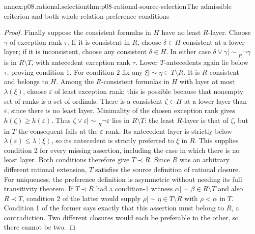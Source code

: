 \begin{annexitem}{annex:p08.rational.selection}{thm:p08-rational-source-selection}{The admissible criterion and both whole-relation preference conditions}
\begin{proof}
Finally suppose the consistent formulas in \(H\) have no least
\(R\)-layer. Choose \(\gamma\) of exception rank \(\tau\).
If it is consistent in \(R\), choose \(\delta\in H\) consistent
at a lower layer; if it is inconsistent, choose any consistent
\(\delta\in H\). In either case
\(\delta\vee\gamma\mathrel{|\!\sim}_R\neg\gamma\)
is in \(R\setminus T\), with antecedent exception rank \(\tau\).
Lower \(T\)-antecedents again lie below \(\tau\), proving
condition 1. For condition 2 fix any
\(\xi\mathrel{|\!\sim}\eta\in T\setminus R\).
It is \(R\)-consistent and belongs to \(H\). Among the
\(R\)-consistent formulas in \(H\) with layer at most
\(\lambda(\xi)\), choose \(\varepsilon\) of least exception
rank; this is possible because that nonempty set of ranks is a set
of ordinals. There is a consistent \(\zeta\in H\) at a lower
layer than \(\varepsilon\), since there is no least layer.
Minimality of the chosen exception rank gives
\(h(\zeta)\geq h(\varepsilon)\).
Thus \(\zeta\vee\varepsilon\mathrel{|\!\sim}_R\neg\varepsilon\)
lies in \(R\setminus T\): the least \(R\)-layer is that of
\(\zeta\), but in \(T\) the consequent fails at the
\(\varepsilon\) rank. Its antecedent layer is strictly below
\(\lambda(\varepsilon)\leq\lambda(\xi)\), so its antecedent
is strictly preferred to \(\xi\) in \(R\). This supplies
condition 2 for every missing assertion, including the case in which
there is no least layer. Both conditions therefore give \(T\prec R\).
Since \(R\) was an arbitrary different rational extension,
\(T\) satisfies the source definition of rational closure.
For uniqueness, the preference definition is asymmetric without needing
its full transitivity theorem. If \(T\prec R\) had a condition-1
witness \(\alpha\mathrel{|\!\sim}\beta\in R\setminus T\)
and also \(R\prec T\), condition 2 of the latter would supply
\(\rho\mathrel{|\!\sim}\eta\in T\setminus R\) with
\(\rho<\alpha\) in \(T\). Condition 1 of the former says
exactly that this assertion must belong to \(R\), a contradiction.
Two different closures would each be preferable to the other, so
there cannot be two.
\end{proof}
\end{annexitem}

